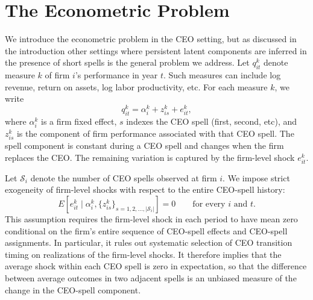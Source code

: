 \documentclass[sigconf,nonacm]{acmart}
\begin{document}


\section{The Econometric Problem}\label{sec:econometric_problem}
We introduce the econometric problem in the CEO setting, but as discussed in the introduction other settings where persistent latent components are inferred in the presence of short spells is the general problem we address.
Let $q_{it}^{k}$ denote measure $k$ of firm $i$'s performance in year
$t$. Such measures can include log
revenue, return on assets, log labor productivity, etc. For each measure
$k$, we write
\begin{equation}
q_{it}^{k}
=
\alpha_i^{k}
+
z_{is}^{k}
+
e_{it}^{k},
\label{eq:outcome_model}
\end{equation}
where $\alpha_i^{k}$ is a firm fixed effect, $s$ indexes the CEO
spell (first, second, etc), and $z_{is}^{k}$ is the component of firm performance associated with that CEO spell. The spell component is constant during a CEO spell and changes when the firm replaces the CEO. The remaining variation is captured by the firm-level
shock $e_{it}^{k}$.

Let $\mathcal S_i$ denote the number of CEO spells observed at firm $i$.
We impose strict exogeneity of firm-level shocks with respect to the entire CEO-spell history:
\begin{equation}
E\!\left[
e_{it}^{k}
\mid
\alpha_i^{k},
\{z_{is}^{k}\}_{s=1,2,...,|\mathcal S_i|}
\right]
=
0
\qquad
\text{for every $i$ and $t$}.
\label{eq:strict_exogeneity}
\end{equation}
This assumption requires the firm-level shock in each period to have
mean zero conditional on the firm's entire sequence of CEO-spell
effects and CEO-spell assignments. In particular, it rules out
systematic selection of CEO transition timing on realizations of the
firm-level shocks. It therefore implies that the average shock within
each CEO spell is zero in expectation, so that the difference between
average outcomes in two adjacent spells is an unbiased measure of the
change in the CEO-spell component.
\end{document}
